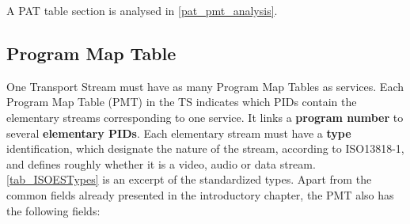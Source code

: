 \documentclass[
	12pt,				%
	openright,			%
	twoside,			%
	a4paper,			%
	brazil,
	french,				%
	english
	]{abntex2}
\begin{document}
A PAT table section is analysed in \autoref{pat_pmt_analysis}.

\subsection{Program Map Table}
\label{PMT}

One Transport Stream must have as many Program Map Tables as services. Each Program Map Table (PMT) in the TS indicates which PIDs contain the elementary streams corresponding to one service. It links a \textbf{program number} to several \textbf{elementary PIDs}. Each elementary stream must have a \textbf{type} identification, which designate the nature of the stream, according to ISO13818-1, and defines roughly whether it is a video, audio or data stream. \autoref{tab_ISOESTypes} is an excerpt of the standardized types. Apart from the common fields already presented in the introductory chapter, the PMT also has the following fields:
\end{document}
